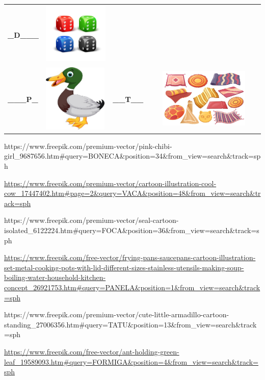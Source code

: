 {\begin{longtable}[]{@{}llll@{}}
\textbf{\_D\_\_\_} &
\includegraphics[width=1.23958in,height=1.15833in]{media/image23.jpeg}\tabularnewline
\textbf{\_\_\_P\_} &
\includegraphics[width=1.19722in,height=1.27083in]{media/image24.jpeg} &
\textbf{\_\_T\_\_} &
\includegraphics[width=2.21875in,height=1.11458in]{media/image25.jpeg}\tabularnewline
\bottomrule
\end{longtable}

https://www.freepik.com/premium-vector/pink-chibi-girl\_9687656.htm\#query=BONECA\&position=34\&from\_view=search\&track=sph

\url{https://www.freepik.com/premium-vector/cartoon-illustration-cool-cow_17447402.htm\#page=2\&query=VACA\&position=48\&from_view=search\&track=sph}

https://www.freepik.com/premium-vector/seal-cartoon-isolated\_6122224.htm\#query=FOCA\&position=36\&from\_view=search\&track=sph

\url{https://www.freepik.com/free-vector/frying-pans-saucepans-cartoon-illustration-set-metal-cooking-pots-with-lid-different-sizes-stainless-utensils-making-soup-boiling-water-household-kitchen-concept_26921753.htm\#query=PANELA\&position=1\&from_view=search\&track=sph}

https://www.freepik.com/premium-vector/cute-little-armadillo-cartoon-standing\_27006356.htm\#query=TATU\&position=13\&from\_view=search\&track=sph

\url{https://www.freepik.com/free-vector/ant-holding-green-leaf_19589093.htm\#query=FORMIGA\&position=4\&from_view=search\&track=sph}

}
